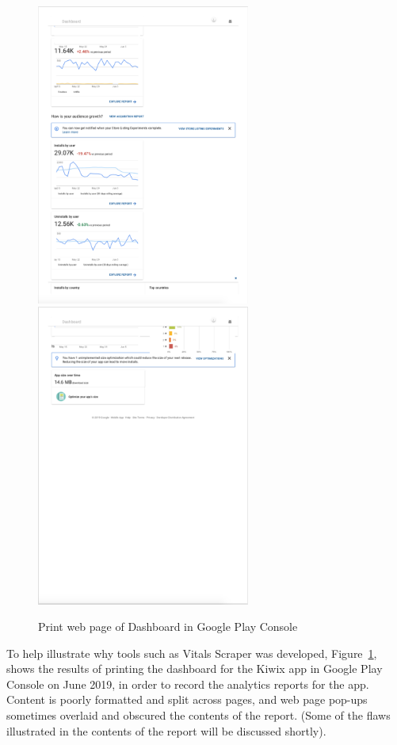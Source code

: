 \begin{figure}
    \newline
    \includegraphics[width=7cm]{images/google-play-console/Dashboard - Kiwix-Google-Play-Console-(2019-Jun-14)-p2.png}
    \includegraphics[width=7cm]{images/google-play-console/Dashboard - Kiwix-Google-Play-Console-(2019-Jun-14)-p4.png}
    \caption{Print web page of Dashboard in Google Play Console}
    \label{fig:screenshot-dashboard-gpc-kiwix}
\end{figure}

To help illustrate why tools such as Vitals Scraper was developed, Figure~\ref{fig:screenshot-dashboard-gpc-kiwix}, shows the results of printing the dashboard for the Kiwix app in Google Play Console on  June 2019, in order to record the analytics reports for the app. Content is poorly formatted and split across pages, and web page pop-ups sometimes overlaid and obscured the contents of the report. (Some of the flaws illustrated in the contents of the report will be discussed shortly).

